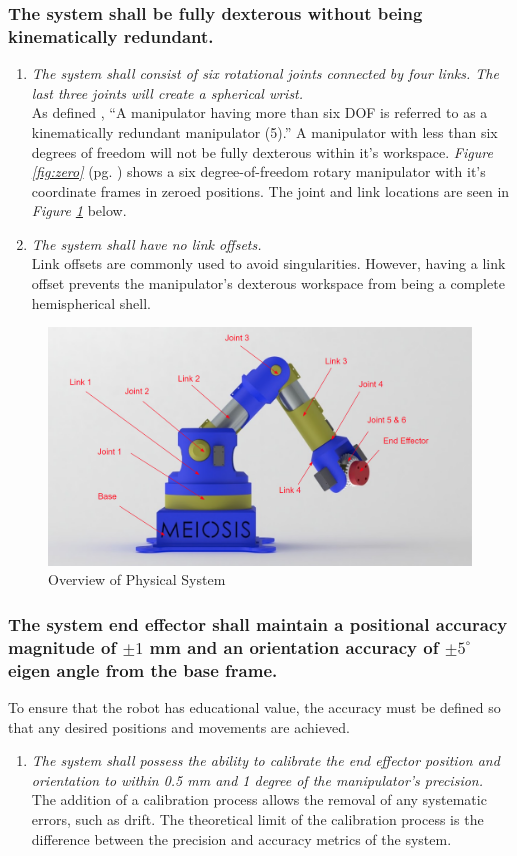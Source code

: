 \documentclass[12pt]{report}
\begin{document}
\subsubsection{The system shall be fully dexterous without being kinematically redundant.}
\begin{enumerate}[label=\thesubsubsection.\alph*,leftmargin=3cm,font=\itshape]
\item \textit{The system shall consist of six rotational joints connected by four links. The last three joints will create a spherical wrist.} \\
As defined \cite{robo}, “A manipulator having more than six DOF is referred to as a kinematically redundant manipulator (5).” A manipulator with less than six degrees of freedom will not be fully dexterous within it's workspace. \emph{Figure \ref{fig:zero}} (pg. \pageref{fig:zero}) shows a six degree-of-freedom rotary manipulator with it's coordinate frames in zeroed positions. The joint and link locations are seen in \emph{Figure \ref{fig:model}} below.
\newpage
\item \textit{The system shall have no link offsets.} \\
Link offsets are commonly used to avoid singularities. However, having a link offset prevents the manipulator's dexterous workspace from being a complete hemispherical shell.
\end{enumerate}
\begin{figure}[htp]
  \centering
  \includegraphics[frame,width=.75\textwidth]{model}
  \caption{Overview of Physical System}
  \label{fig:model}
\end{figure}
\subsubsection{The system end effector shall maintain a positional accuracy magnitude of \(\pm 1\) mm and an orientation accuracy of \(\pm 5^{\circ}\) eigen angle from the base frame.}
To ensure that the robot has educational value, the accuracy must be defined so that any desired positions and movements are achieved.
\begin{enumerate}[label=\thesubsubsection.\alph*,leftmargin=3cm,font=\itshape]
  \item \textit{The system shall possess the ability to calibrate the end effector position and orientation to within 0.5 mm and 1 degree of the manipulator’s precision.}\\
The addition of a calibration process allows the removal of any systematic errors, such as drift. The theoretical limit of the calibration process is the difference between the precision and accuracy metrics of the system.
\end{enumerate}
\end{document}
